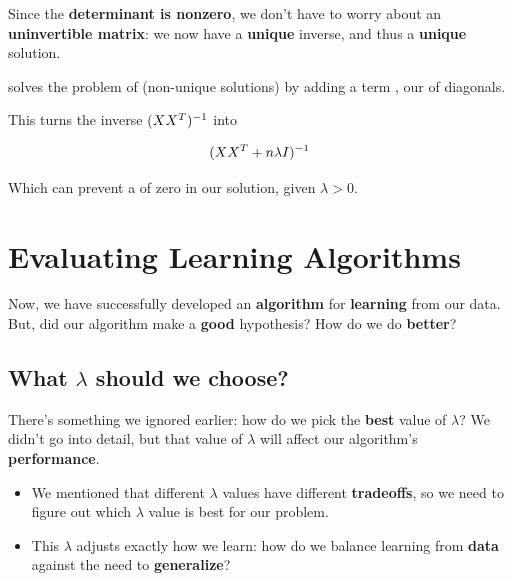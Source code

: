         Since the \textbf{determinant is nonzero}, we don't have to worry about an \textbf{uninvertible matrix}: we now have a \textbf{unique} inverse, and thus a \textbf{unique} solution.\\
        
        \begin{concept}
             solves the problem of  (non-unique solutions) by adding a term , our  of diagonals.
            
            This turns the inverse $(XX^T)^{-1}$ into 
            
            \begin{equation*}
                (XX^T + n \lambda I)^{-1}
            \end{equation*}
            
            Which can prevent a  of zero in our solution, given $\lambda>0$.
        \end{concept}
        
        
        
    
\pagebreak
        
\section{Evaluating Learning Algorithms}

    Now, we have successfully developed an \textbf{algorithm} for \textbf{learning} from our data. But, did our algorithm make a \textbf{good} hypothesis? How do we do \textbf{better}?
    
    \subsection{What $\lambda$ should we choose?}
    
        There's something we ignored earlier: how do we pick the \textbf{best} value of $\lambda$? We didn't go into detail, but that value of $\lambda$ will affect our algorithm's \textbf{performance}.
        
        \begin{itemize}
            \item We mentioned that different $\lambda$ values have different \textbf{tradeoffs}, so we need to figure out which $\lambda$ value is best for our problem.
            
            \item This $\lambda$ adjusts exactly how we learn: how do we balance learning from \textbf{data} against the need to \textbf{generalize}?
        \end{itemize}
        
